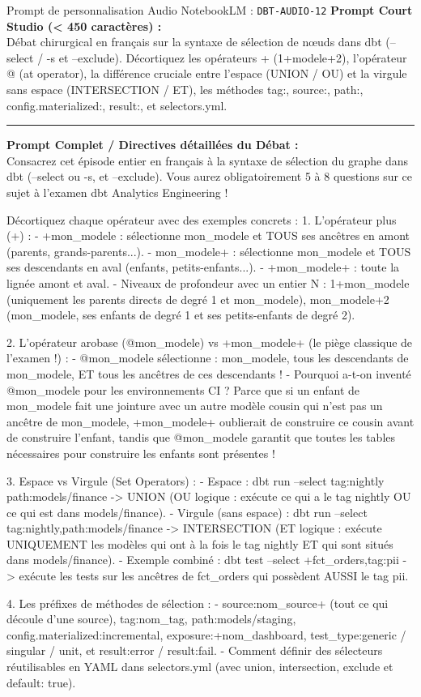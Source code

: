 \documentclass[11pt,a4paper]{article}
\begin{document}
\begin{promptbox}{Prompt de personnalisation Audio NotebookLM : \texttt{DBT-AUDIO-12}}
\textbf{Prompt Court Studio (< 450 caractères) :}\\
Débat chirurgical en français sur la syntaxe de sélection de nœuds dans dbt (--select / -s et --exclude). Décortiquez les opérateurs + (1+modele+2), l'opérateur @ (at operator), la différence cruciale entre l'espace (UNION / OU) et la virgule sans espace (INTERSECTION / ET), les méthodes tag:, source:, path:, config.materialized:, result:, et selectors.yml.

\medskip\hrule\medskip
\textbf{Prompt Complet / Directives détaillées du Débat :}\\
Consacrez cet épisode entier en français à la syntaxe de sélection du graphe dans dbt (--select ou -s, et --exclude). Vous aurez obligatoirement 5 à 8 questions sur ce sujet à l'examen dbt Analytics Engineering !

Décortiquez chaque opérateur avec des exemples concrets :
1. L'opérateur plus (+) :
- +mon\_modele : sélectionne mon\_modele et TOUS ses ancêtres en amont (parents, grands-parents...).
- mon\_modele+ : sélectionne mon\_modele et TOUS ses descendants en aval (enfants, petits-enfants...).
- +mon\_modele+ : toute la lignée amont et aval.
- Niveaux de profondeur avec un entier N : 1+mon\_modele (uniquement les parents directs de degré 1 et mon\_modele), mon\_modele+2 (mon\_modele, ses enfants de degré 1 et ses petits-enfants de degré 2).

2. L'opérateur arobase (@mon\_modele) vs +mon\_modele+ (le piège classique de l'examen !) :
- @mon\_modele sélectionne : mon\_modele, tous les descendants de mon\_modele, ET tous les ancêtres de ces descendants !
- Pourquoi a-t-on inventé @mon\_modele pour les environnements CI ? Parce que si un enfant de mon\_modele fait une jointure avec un autre modèle cousin qui n'est pas un ancêtre de mon\_modele, +mon\_modele+ oublierait de construire ce cousin avant de construire l'enfant, tandis que @mon\_modele garantit que toutes les tables nécessaires pour construire les enfants sont présentes !

3. Espace vs Virgule (Set Operators) :
- Espace : dbt run --select tag:nightly path:models/finance -> UNION (OU logique : exécute ce qui a le tag nightly OU ce qui est dans models/finance).
- Virgule (sans espace) : dbt run --select tag:nightly,path:models/finance -> INTERSECTION (ET logique : exécute UNIQUEMENT les modèles qui ont à la fois le tag nightly ET qui sont situés dans models/finance).
- Exemple combiné : dbt test --select +fct\_orders,tag:pii -> exécute les tests sur les ancêtres de fct\_orders qui possèdent AUSSI le tag pii.

4. Les préfixes de méthodes de sélection :
- source:nom\_source+ (tout ce qui découle d'une source), tag:nom\_tag, path:models/staging, config.materialized:incremental, exposure:+nom\_dashboard, test\_type:generic / singular / unit, et result:error / result:fail.
- Comment définir des sélecteurs réutilisables en YAML dans selectors.yml (avec union, intersection, exclude et default: true).
\end{promptbox}
\end{document}
